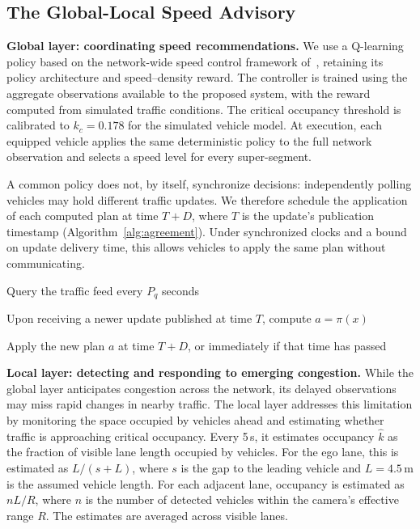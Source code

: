\documentclass[letterpaper, 10pt, journal, twoside]{IEEEtran}
\begin{document}
\subsection{The Global-Local Speed Advisory}

\label{sec:controller}

\noindent\textbf{Global layer: coordinating speed recommendations.} We use a Q-learning policy based on the network-wide speed control framework of~\cite{self_regulating_cars}, retaining its policy architecture and speed--density reward. The controller is trained using the aggregate observations available to the proposed system, with the reward computed from simulated traffic conditions. The critical occupancy threshold is calibrated to $k_c=0.178$ for the simulated vehicle model. At execution, each equipped vehicle applies the same deterministic policy to the full network observation and selects a speed level for every super-segment.

A common policy does not, by itself, synchronize decisions: independently polling vehicles may hold different traffic updates. We therefore schedule the application of each computed plan at time $T+D$, where $T$ is the update's publication timestamp (Algorithm~\ref{alg:agreement}). Under synchronized clocks and a bound on update delivery time, this allows vehicles to apply the same plan without communicating.

\begin{algorithm}[t]

\caption{Coordinated speed planning without vehicle communication}

\label{alg:agreement}

\begin{algorithmic}[1]

\State Query the traffic feed every $P_q$ seconds

\State Upon receiving a newer update published at time $T$, compute $a=\pi(x)$

\State Apply the new plan $a$ at time $T+D$, or immediately if that time has passed
\end{algorithmic}

\end{algorithm}

\noindent\textbf{Local layer: detecting and responding to emerging congestion.} While the global layer anticipates congestion across the network, its delayed observations may miss rapid changes in nearby traffic. The local layer addresses this limitation by monitoring the space occupied by vehicles ahead and estimating whether traffic is approaching critical occupancy. Every 5\,s, it estimates occupancy $\hat{k}$ as the fraction of visible lane length occupied by vehicles. For the ego lane, this is estimated as $L/(s+L)$, where $s$ is the gap to the leading vehicle and $L=4.5$\,m is the assumed vehicle length. For each adjacent lane, occupancy is estimated as $nL/R$, where $n$ is the number of detected vehicles within the camera's effective range $R$. The estimates are averaged across visible lanes.
\end{document}
